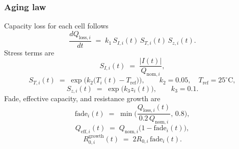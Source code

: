 \documentclass[%
 aip,
 amsmath,amssymb,
reprint, onecolumn %
]{revtex4-1}
\begin{document}
\subsubsection{Aging law}
\label{subsubsec:aging_law}
Capacity loss for each cell follows
\begin{equation}
\frac{d Q_{\mathrm{loss},i}}{d t} \;=\; k_1\, S_{I,i}(t)\, S_{T,i}(t)\, S_{z,i}(t).
\end{equation}
Stress terms are
\begin{equation}
S_{I,i}(t) \;=\; \frac{|I(t)|}{Q_{\mathrm{nom},i}},
\end{equation}
\begin{equation}
S_{T,i}(t) \;=\; \exp\!\Big(k_2\big(T_i(t)-T_{\mathrm{ref}}\big)\Big),
\qquad k_2 = 0.05,\quad T_{\mathrm{ref}} = 25^\circ\mathrm{C},
\end{equation}
\begin{equation}
S_{z,i}(t) \;=\; \exp\!\big(k_3 z_i(t)\big),
\qquad k_3 = 0.1.
\end{equation}
Fade, effective capacity, and resistance growth are
\begin{equation}
\mathrm{fade}_i(t) \;=\; \min\!\Big( \frac{Q_{\mathrm{loss},i}(t)}{0.2\, Q_{\mathrm{nom},i}},\, 0.8 \Big),
\end{equation}
\begin{equation}
Q_{\mathrm{eff},i}(t) \;=\; Q_{\mathrm{nom},i}\big(1-\mathrm{fade}_i(t)\big),
\end{equation}
\begin{equation}
R^{\mathrm{growth}}_{0,i}(t) \;=\; 2 R_{0,i}\, \mathrm{fade}_i(t).
\end{equation}
\end{document}

